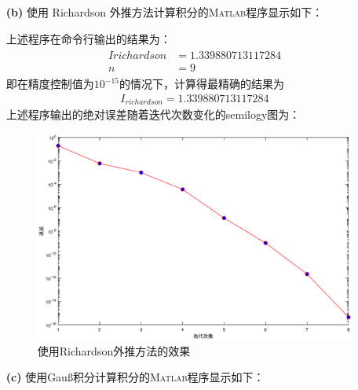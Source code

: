 \documentclass[12pt,a4paper,utf8]{ctexart}
\begin{document}
\begin{enumerate}
   \item[\textbf{(b)}]
         使用 Richardson 外推方法计算积分的\textsc{Matlab}程序显示如下：
         

         上述程序在命令行输出的结果为：
         \begin{eqnarray}
            \begin{aligned}
               Irichardson & = 1.339880713117284 \\
               n           & =9
               \nonumber
            \end{aligned}
         \end{eqnarray}
         即在精度控制值为$10^{-15}$的情况下，计算得最精确的结果为
         \begin{eqnarray}
            I_{richardson}=1.339880713117284
            \nonumber
         \end{eqnarray}
         上述程序输出的绝对误差随着迭代次数变化的semilogy图为：
         \begin{figure}[H]
            \centering
            \includegraphics[width=1\textwidth]{fig/p1b.eps}
            \caption{使用Richardson外推方法的效果}
         \end{figure}

   \item[\textbf{(c)}]
         使用Gauß积分计算积分的\textsc{Matlab}程序显示如下：
         


\end{enumerate}
\end{document}
